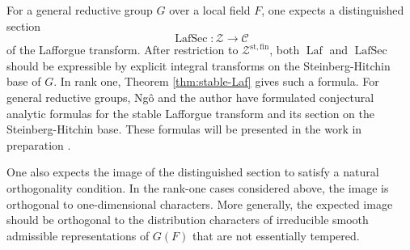 \documentclass[iccmp]{ipbook}
\newcommand{\CC}{{\mathcal {C}}}
\newcommand{\CZ}{{\mathcal {Z}}}
\newcommand{\st}{{\mathrm{st}}}
\newcommand{\Laf}{\operatorname{Laf}}
\newcommand{\LafSec}{\operatorname{LafSec}}
\newcommand{\fin}{\mathrm{fin}}
\begin{document}
For a general reductive group $G$ over a local field $F$, one expects a
distinguished section
\[
\LafSec:\CZ\to \CC
\]
of the Lafforgue transform. After restriction to $\CZ^{\st,\fin}$, both $\Laf$ and
$\LafSec$ should be expressible by explicit integral transforms on the Steinberg-Hitchin
base of $G$. In rank one, Theorem \ref{thm:stable-Laf} gives such a formula. For general
reductive groups, Ng\^o and the author have formulated conjectural analytic formulas
for the stable Lafforgue transform and its section on the Steinberg-Hitchin base.
These formulas will be presented in the work in preparation \cite{NL-general}.

One also expects the image of the distinguished section to satisfy a natural orthogonality
condition. In the rank-one cases considered above, the image is orthogonal to one-dimensional
characters. More generally, the expected image should be orthogonal to the distribution
characters of irreducible smooth admissible representations of $G(F)$ that are not essentially
tempered.
\end{document}
